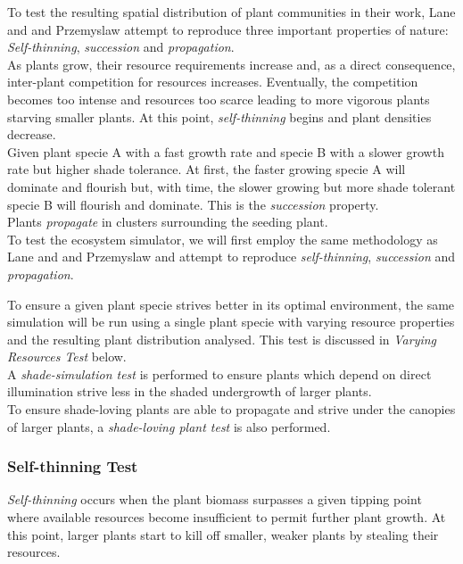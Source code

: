 To test the resulting spatial distribution of plant communities in their work, Lane and and Przemyslaw \cite{Lane2002} attempt to reproduce three important properties of nature: \textit{Self-thinning}, \textit{succession} and \textit{propagation}.\\
As plants grow, their resource requirements increase and, as a direct consequence, inter-plant competition for resources increases. Eventually, the competition becomes too intense and resources too scarce leading to more vigorous plants starving smaller plants. At this point, \textit{self-thinning} begins and plant densities decrease.\\
Given plant specie A with a fast growth rate and specie B with a slower growth rate but higher shade tolerance. At first, the faster growing specie A will dominate and flourish but, with time, the slower growing but more shade tolerant specie B will flourish and dominate. This is the \textit{succession} property.\\
Plants \textit{propagate} in clusters surrounding the seeding plant.\\

To test the ecosystem simulator, we will first employ the same methodology as Lane and and Przemyslaw \cite{Lane2002} and attempt to reproduce \textit{self-thinning}, \textit{succession} and \textit{propagation}.

To ensure a given plant specie strives better in its optimal environment, the same simulation will be run using a single plant specie with varying resource properties and the resulting plant distribution analysed. This test is discussed in \textit{Varying Resources Test} below.\\

A \textit{shade-simulation test} is performed to ensure plants which depend on direct illumination strive less in the shaded undergrowth of larger plants.\\ 

To ensure shade-loving plants are able to propagate and strive under the canopies of larger plants, a \textit{shade-loving plant test} is also performed.

\subsubsection{Self-thinning Test}

\textit{Self-thinning} occurs when the plant biomass surpasses a given tipping point where available resources become insufficient to permit further plant growth. At this point, larger plants start to kill off smaller, weaker plants by stealing their resources.\\

